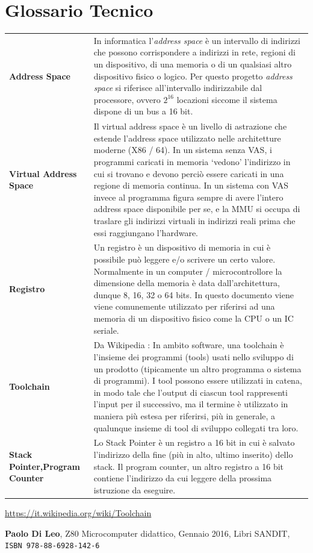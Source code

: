 \documentclass[a4paper, 11pt]{article}
\begin{document}
\section*{Glossario Tecnico}
{\def\arraystretch{1.4}
\begin{tabular}{ >{\bfseries}p{.35\linewidth} p{.65\linewidth} }

    Address Space & In informatica l'\emph{address space} \`e un intervallo di
    indirizzi che possono corrispondere a indirizzi in rete, regioni di un
    dispositivo, di una memoria o di un qualsiasi altro dispositivo fisico o
    logico.  Per questo progetto \emph{address space} si riferisce
    all'intervallo indirizzabile dal processore, ovvero \(2^{16}\) locazioni
    siccome il sistema dispone di un bus a 16 bit. \\

    Virtual Address Space & Il virtual address space \`e un livello di
    astrazione che estende l'address space utilizzato nelle architetture
    moderne (X86 / 64). In un sistema senza VAS, i programmi caricati in
    memoria `vedono' l'indirizzo in cui si trovano e devono perci\`o essere
    caricati in una regione di memoria continua. In un sistema con VAS invece
    al programma figura sempre di avere l'intero address space disponibile per
    se, e la MMU si occupa di traslare gli indirizzi virtuali in indirizzi
    reali prima che essi raggiungano l'hardware. \\

    Registro & Un registro \`e un dispositivo di memoria in cui \`e possibile
    pu\`o leggere e/o scrivere un certo valore. Normalmente in un computer /
    microcontrollore la dimensione della memoria \`e data dall'architettura,
    dunque 8, 16, 32 o 64 bits.  In questo documento viene viene comunemente
    utilizzato per riferirsi ad una memoria di un dispositivo fisico come la
    CPU o un IC seriale. \\

    Toolchain & Da Wikipedia \cite{wiki:toolchain}: In ambito software, una
    toolchain è l'insieme dei programmi (tools) usati nello sviluppo di un
    prodotto (tipicamente un altro programma o sistema di programmi). I tool
    possono essere utilizzati in catena, in modo tale che l'output di ciascun
    tool rappresenti l'input per il successivo, ma il termine è utilizzato in
    maniera più estesa per riferirsi, più in generale, a qualunque insieme di
    tool di sviluppo collegati tra loro. \\

    Stack Pointer,\newline Program Counter & Lo Stack Pointer \`e un registro a
    16 bit in cui \`e salvato l'indirizzo della fine (pi\`u in alto, ultimo
    inserito) dello stack. Il program counter, un altro registro a 16 bit
    contiene l'indirizzo da cui leggere della prossima istruzione da
    eseguire.\\

\end{tabular}}

\begin{thebibliography}{2}
    \url{https://it.wikipedia.org/wiki/Toolchain}

    \textbf{Paolo Di Leo},
    Z80 Microcomputer didattico, 
    Gennaio 2016,
    Libri SANDIT,
    {\tt ISBN 978-88-6928-142-6}

\end{thebibliography}
\end{document}
